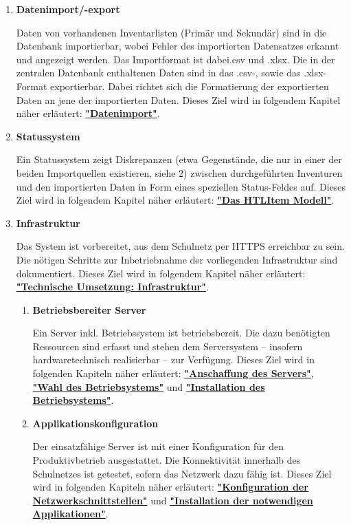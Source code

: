 \documentclass[
    headings=optiontotocandhead,%
    twoside,
    numbers=noenddot,%
    toc=flat, %
    12pt, %
    titlepage, %
    parskip=full, %
    listof=totoc, %
    listof=flat, %
    numbers=noenddot, %
    bibliography=totoc, %
    a4paper,DIV=14,
    BCOR=15mm,
]{scrbook}
\begin{document}
\begin{enumerate}
    \item \textbf{Datenimport/-export}

    Daten von vorhandenen Inventarlisten (Primär und Sekundär) sind in die Datenbank importierbar, wobei Fehler des importierten Datensatzes erkannt und angezeigt werden. Das Importformat ist dabei.csv und .xlsx. 
    Die in der zentralen Datenbank enthaltenen Daten sind in das .csv-, sowie das .xlsx-Format exportierbar. Dabei richtet sich die Formatierung der exportierten Daten an jene der importierten Daten. 
    Dieses Ziel wird in folgendem Kapitel näher erläutert: \textbf{\hyperref[datenimport]{"Datenimport"}}.


    \item \textbf{Statussystem}

    Ein Statussystem zeigt Diskrepanzen (etwa Gegenstände, die nur in einer der beiden Importquellen existieren, siehe 2) zwischen durchgeführten Inventuren und den importierten Daten in Form eines speziellen Status-Feldes auf. 
    Dieses Ziel wird in folgendem Kapitel näher erläutert: \textbf{\hyperref[das-htlitem-modell]{"Das HTLItem Modell"}}.



    \item \textbf{Infrastruktur}

    Das System ist vorbereitet, aus dem Schulnetz per HTTPS erreichbar zu sein. Die nötigen Schritte zur Inbetriebnahme der vorliegenden Infrastruktur sind dokumentiert. 
    Dieses Ziel wird in folgendem Kapitel näher erläutert: \textbf{\hyperref[technische-umsetzung-infrastruktur]{"Technische Umsetzung: Infrastruktur"}}.
    
    \begin{enumerate}
      \item	\textbf{Betriebsbereiter Server}

      Ein Server inkl. Betriebssystem ist betriebsbereit. Die dazu benötigten Ressourcen sind erfasst und stehen dem Serversystem – insofern hardwaretechnisch realisierbar – zur Verfügung.
      Dieses Ziel wird in folgenden Kapiteln näher erläutert: \textbf{\hyperref[anschaffung-des-servers]{"Anschaffung des Servers"}}, \textbf{\hyperref[wahl-des-betriebsystemes]{"Wahl des Betriebsystems"}} und \textbf{\hyperref[installation-des-betriebsystemes]{"Installation des Betriebsystems"}}.
    
      \item	\textbf{Applikationskonfiguration}

      Der einsatzfähige Server ist mit einer Konfiguration für den Produktivbetrieb ausgestattet. Die Konnektivität innerhalb des Schulnetzes ist getestet, sofern das Netzwerk dazu fähig ist.
      Dieses Ziel wird in folgenden Kapiteln näher erläutert: \textbf{\hyperref[konfiguration-der-netzwerkschnittstellen]{"Konfiguration der Netzwerkschnittstellen"}} und \textbf{\hyperref[installation-der-notwendigen-applikationen]{"Installation der notwendigen Applikationen"}}.
      

\end{enumerate}
\end{enumerate}
\end{document}

